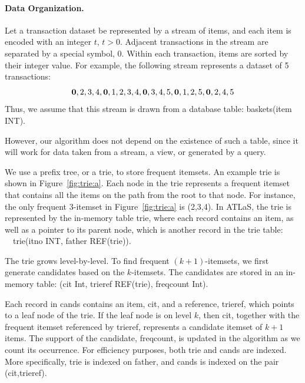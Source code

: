 \paragraph{Data Organization.} Let a transaction dataset be represented by
a stream of items, and each item is encoded with an integer $t$,
$t>0$. Adjacent transactions in the stream are separated by a special
symbol, 0.  Within each transaction, items are sorted by their integer
value. For example, the following stream represents a dataset of 5
transactions:
\begin{equation}
{\bf 0},2,3,4,{\bf 0},1,2,3,4,{\bf 0},3,4,5,{\bf 0},1,2,5,{\bf 0},2,4,5
\label{equ:data}
\end{equation}
Thus, we assume that this stream is drawn from a database table:
{\bw baskets(item} {\cw INT)}.

However, our algorithm does not depend on the existence of such a
table, since it will work for data taken from a stream, a view, or
generated by a query.

We use a prefix tree, or a trie, to store frequent itemsets. An
example trie is shown in Figure~\ref{fig:trie:a}. Each node in the
trie represents a frequent itemset that contains all the items on the
path from the root to that node. For instance, the only frequent
3-itemset in Figure~\ref{fig:trie:a} is (2,3,4). In ATLaS, the trie is
represented by the in-memory table {\bw trie}, where each
record contains an item, as well as a pointer to its parent node,
which is another record in the {\bw trie} table:
{\cw  \ \ {\bw trie(itno} INT, {\bw father} REF{\bw (trie)}).}

The trie grows level-by-level. To find frequent $(k+1)$-itemsets, we
first generate candidates based on the $k$-itemsets. The candidates
are stored in an in-memory table: {({\bw cit} Int, {\bw
    trieref } REF{\bw(trie), freqcount} {\cw Int)}.}


Each record in {\bw cands} contains an item, {\bw cit}, and a
reference, {\bw trieref}, which points to a leaf node of the trie.  If
the leaf node is on level $k$, then {\bw cit}, together with the
frequent itemset referenced by {\bw trieref}, represents a candidate
itemset of $k+1$ items. The support of the candidate, {\bw freqcount},
is updated in the algorithm as we count its occurrence.
For efficiency purposes, both {\bw trie} and {\bw cands} are indexed.
More specifically, {\bw trie} is indexed on {\bw father},
and {\bw cands} is indexed on the pair {\bw (cit,trieref)}.

